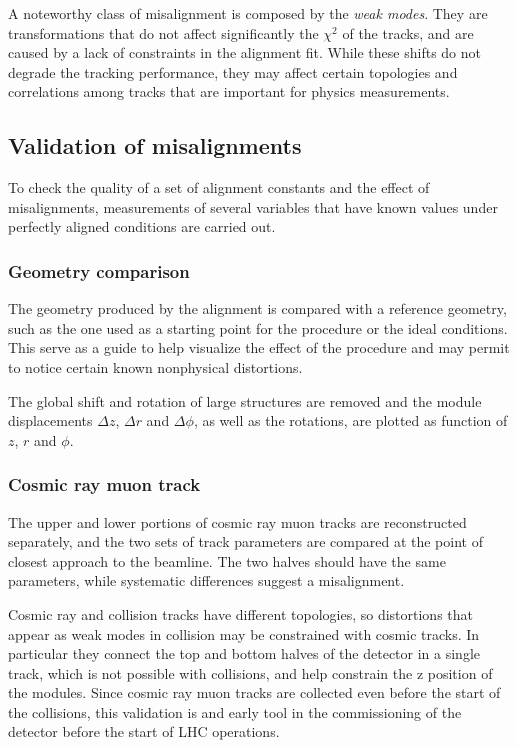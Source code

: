 A noteworthy class of misalignment is composed by the \textit{weak modes}.
They are transformations that do not affect significantly the $\chi^2$ of the tracks,
and are caused by a lack of constraints in the alignment fit.
While these shifts do not degrade the tracking performance,
they may affect certain topologies and correlations among tracks that are important for physics measurements.

\subsection{Validation of misalignments}
To check the quality of a set of alignment constants and the effect of misalignments,
measurements of several variables that have known values under perfectly aligned conditions are carried out.

\subsubsection{Geometry comparison} %
The geometry produced by the alignment is compared with a reference geometry,
such as the one used as a starting point for the procedure or the ideal conditions.
This serve as a guide to help visualize the effect of the procedure
and may permit to notice certain known nonphysical distortions.

The global shift and rotation of large structures are removed and the module displacements
$\Delta z$, $\Delta r$ and $\Delta \phi$, as well as the rotations,
are plotted as function of $z$, $r$ and $\phi$.

\subsubsection{Cosmic ray muon track} %
The upper and lower portions of cosmic ray muon tracks are reconstructed separately,
and the two sets of track parameters are compared at the point of closest approach to the beamline.
The two halves should have the same parameters, while systematic differences suggest a misalignment.

Cosmic ray and collision tracks have different topologies, so distortions that appear as
weak modes in collision may be constrained with cosmic tracks.
In particular they connect the top and bottom halves of the detector in a single track,
which is not possible with collisions, and help constrain the z position of the modules.
Since cosmic ray muon tracks are collected even before the start of the collisions,
this validation is and early tool in the commissioning of the detector before the start of LHC operations.

